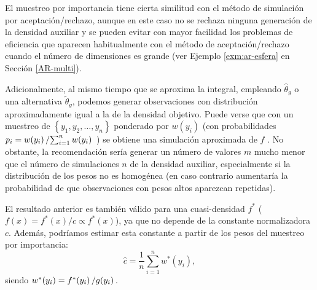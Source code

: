 \documentclass[
  spanish,
  10pt,
]{book}
\theoremstyle{break}
\theoremstyle{nonumberplain}
\begin{document}
El muestreo por importancia tiene cierta similitud con el método de simulación por aceptación/rechazo, aunque en este caso no se rechaza ninguna generación de la densidad auxiliar y se pueden evitar con mayor facilidad los problemas de eficiencia que aparecen habitualmente con el método de aceptación/rechazo cuando el número de dimensiones es grande (ver Ejemplo \ref{exm:ar-esfera} en Sección \ref{AR-multi}).

Adicionalmente, al mismo tiempo que se aproxima la integral, empleando \(\hat{\theta}_{g}\) o una alternativa \(\tilde{\theta}_{g}\), podemos generar observaciones con distribución aproximadamente igual a la de la densidad objetivo.
Puede verse que con un muestreo de \(\left\{y_1, y_2, \ldots, y_n \right\}\) ponderado por \(w(y_i)\) (con probabilidades \(p_i=w(y_i)\left/ \sum\nolimits_{i=1}^n w(y_i) \right.\) ) se obtiene una simulación aproximada de \(f\) \citep[\emph{Sample importance resampling},][]{rubin1987}.
No obstante, la recomendación sería generar un número de valores \(m\) mucho menor que el número de simulaciones \(n\) de la densidad auxiliar, especialmente si la distribución de los pesos no es homogénea (en caso contrario aumentaría la probabilidad de que observaciones con pesos altos aparezcan repetidas).

El resultado anterior es también válido para una cuasi-densidad \(f^{\ast}\) (\(f(x) = f^{\ast}(x)/c \propto f^{\ast}(x)\)), ya que no depende de la constante normalizadora \(c\).
Además, podríamos estimar esta constante a partir de los pesos del muestreo por importancia:
\[\hat c = \frac{1}{n}\sum_{i=1}^n w^{\ast}(y_i),\]
siendo \(w^{\ast}(y_i) = f^{\ast}(y_i) \left/ g(y_i) \right.\).
\end{document}
